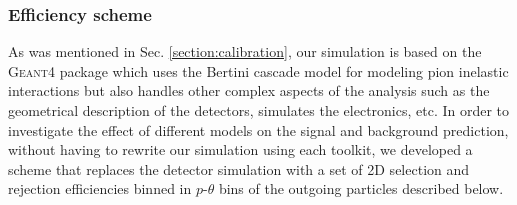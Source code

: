\subsubsection{\bf{Efficiency scheme}}
As was mentioned in Sec. \ref{section:calibration}, our simulation is based on the \textsc{Geant4} package which uses the Bertini cascade model for modeling pion inelastic interactions but also handles other complex aspects of the analysis such as the geometrical description of the detectors, simulates the electronics, etc. In order to investigate the effect of different models on the signal and background prediction, without having to rewrite our simulation using each toolkit, we developed a scheme that replaces the detector simulation with a set of 2D selection and rejection efficiencies binned in $p$-$\theta$ bins of the outgoing particles described below.
